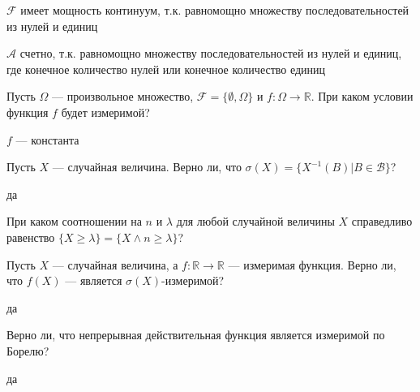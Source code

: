 \begin{solution}
\begin{problem}
\end{problem} 
\begin{solution} 

$\mathcal{F}$ имеет мощность континуум, т.к. равномощно множеству последовательностей из нулей и единиц

$\mathcal{A}$ счетно, т.к. равномощно множеству последовательностей из нулей и единиц, где конечное количество нулей или конечное количество единиц

\end{solution}

\begin{problem}
Пусть $\Omega$ --- произвольное множество,
$\mathcal{F}=\{\emptyset,\Omega\}$ и $f:\Omega\rightarrow
\mathbb{R}$. При
каком условии функция $f$ будет измеримой? 
\end{problem} 
\begin{solution} 
$f$ --- константа
\end{solution}

\begin{problem}
Пусть $X$ --- случайная величина. Верно ли, что
$\sigma(X)=\{X^{-1}(B)|B \in \mathcal{B} \}$? 
\end{problem} 
\begin{solution} 
да
\end{solution}

\begin{problem}
При каком соотношении на $n$ и $\lambda$ для любой случайной
величины $X$ справедливо равенство $\{X\ge \lambda\}=\{X\wedge
n\ge\lambda\}$? 
\end{problem} 
\begin{solution} 

\end{solution}

\begin{problem}
Пусть $X$ --- случайная величина, а $f:\mathbb{R}\rightarrow
\mathbb{R}$ --- измеримая функция.
Верно ли, что $f(X)$ --- является $\sigma(X)$-измеримой? 
\end{problem} 
\begin{solution} 
да
\end{solution}

\begin{problem}
Верно ли, что непрерывная действительная функция является
измеримой по Борелю? 
\end{problem} 
\begin{solution} 
да
\end{solution}


\end{solution}
